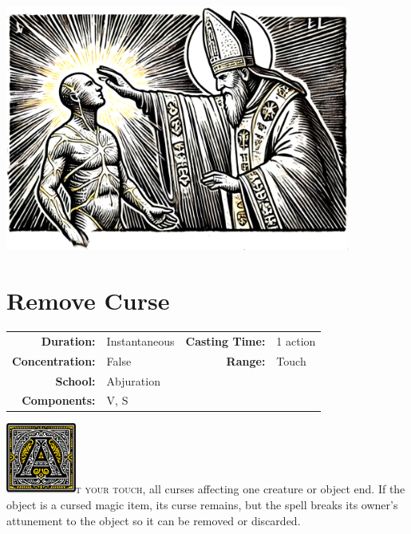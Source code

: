 \documentclass[12pt,showtrims]{memoir}
\begin{document}
\vfill\vfill
\begin{center}
\includegraphics[width=0.85\textwidth]{spell_artwork/protection_from_energy.png}
\end{center}
\vfill
\newpage
\section*{Remove Curse}

{
\small\centering\vspace{-6pt}
\begin{tabular}{rlrl}
\toprule

\textbf{Duration:} & Instantaneous &
\textbf{Casting Time:} & 1 action \\
\textbf{Concentration:} & False &
\textbf{Range:} & Touch \\
\textbf{School:} & Abjuration \\
\textbf{Components:} & \multicolumn{3}{p{0.7\textwidth}}{V, S}\\

\bottomrule
\end{tabular}
}

\vspace{1\baselineskip}\noindent
\lettrine[lines=4]{\includegraphics[height=66pt]{initials/A.png}}{t your touch}, all curses affecting one creature or object end. If the object is a cursed magic item, its curse remains, but the spell breaks its owner's attunement to the object so it can be removed or discarded.
\end{document}
